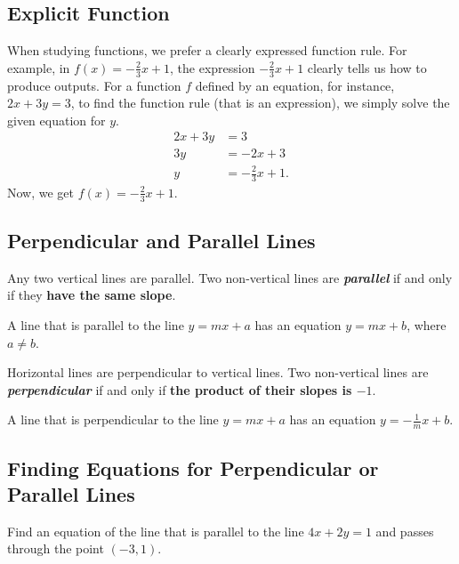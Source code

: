 \hypertarget{explicit-function}{%
\subsection{Explicit Function}\label{explicit-function}}

When studying functions, we prefer a clearly expressed function rule.
For example, in \(f(x)=-\frac23x+1\), the expression \(-\frac23x+1\)
clearly tells us how to produce outputs. For a function \(f\) defined by
an equation, for instance, \(2x+3y=3\), to find the function rule (that
is an expression), we simply solve the given equation for \(y\). \[
\begin{aligned}
2x+3y&=3\\
3y&=-2x+3\\
y&=-\frac23x+1.
\end{aligned}
\] Now, we get \(f(x)=-\frac23x+1\).

\hypertarget{perpendicular-and-parallel-lines}{%
\subsection{Perpendicular and Parallel
Lines}\label{perpendicular-and-parallel-lines}}

Any two vertical lines are parallel. Two non-vertical lines are
\textbf{\emph{parallel}} if and only if they \textbf{have the same
slope}.

A line that is parallel to the line \(y=mx+a\) has an equation
\(y=mx+b\), where \(a\neq b\).

Horizontal lines are perpendicular to vertical lines. Two non-vertical
lines are \textbf{\emph{perpendicular}} if and only if \textbf{the
product of their slopes is \(-1\)}.

A line that is perpendicular to the line \(y=mx+a\) has an equation
\(y=-\frac1m x+b\).

\hypertarget{finding-equations-for-perpendicular-or-parallel-lines}{%
\subsection{Finding Equations for Perpendicular or Parallel
Lines}\label{finding-equations-for-perpendicular-or-parallel-lines}}

\begin{example}

Find an equation of the line that is parallel to the line \(4x+2y=1\)
and passes through the point \((-3, 1)\).

\end{example}
\vspace*{6\baselineskip}

